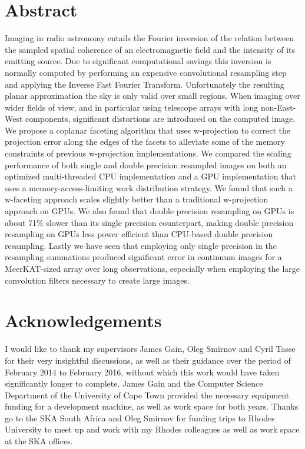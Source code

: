 \chapter*{Abstract}
 Imaging in radio astronomy entails the Fourier inversion of the relation between the sampled spatial coherence of an electromagnetic field and the intensity of its 
 emitting source. Due to significant computational savings this inversion is normally computed by performing an expensive convolutional resampling step and applying 
 the Inverse Fast Fourier Transform. Unfortunately the resulting planar approximation the sky is only valid over small regions. When imaging over wider fields of view,
 and in particular using telescope arrays with long non-East-West components, significant distortions are introduced on the computed image. We propose a coplanar faceting
 algorithm that uses w-projection to correct the projection error along the edges of the facets to alleviate some of the memory constraints of previous w-projection implementations. 
 We compared the scaling performance of both single and double precision resampled images on both an optimized multi-threaded CPU implementation and a GPU implementation that uses a 
 memory-access-limiting work distribution strategy. We found that such a w-faceting approach scales slightly better than a traditional w-projection approach on GPUs. We also found that
 double precision resampling on GPUs is about 71\% slower than its single precision counterpart, making double precision resampling on GPUs less power efficient than CPU-based double 
 precision resampling. Lastly we have seen that employing only single precision in the resampling summations produced significant error in continuum images for a MeerKAT-sized 
 array over long observations, especially when employing the large convolution filters necessary to create large images.
 
\chapter*{Acknowledgements}
 I would like to thank my supervisors James Gain, Oleg Smirnov and Cyril Tasse for their very insightful discussions, as well as 
 their guidance over the period of February 2014 to February 2016, without which this work would have taken significantly longer 
 to complete. James Gain and the Computer Science Department of the University of Cape Town provided the necessary equipment funding for a 
 development machine, as well as work space for both years. Thanks go to the SKA South Africa and Oleg Smirnov for funding 
 trips to Rhodes University to meet up and work with my Rhodes colleagues as well as work space at the SKA offices.
 
